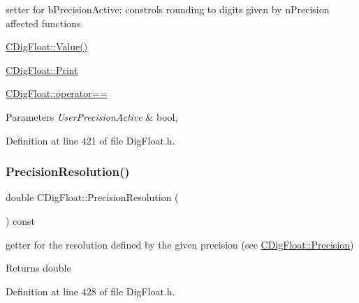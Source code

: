 setter for b\+Precision\+Active\+: constrols rounding to digits given by n\+Precision affected functions 


\begin{DoxyItemize}
\item \hyperlink{classCDigFloat_af74b8cd0935294b6371f551b7a1ff640}{C\+Dig\+Float\+::\+Value()}
\item \hyperlink{classCDigFloat_a80731e0970f607114d6d1bde4d02bd39}{C\+Dig\+Float\+::\+Print}
\item \hyperlink{classCDigFloat_ad8980d984bf2bab71d15b830fd0180a5}{C\+Dig\+Float\+::operator==}
\end{DoxyItemize}


\begin{DoxyParams}{Parameters}
{\em User\+Precision\+Active} & bool, \\
\hline
\end{DoxyParams}


Definition at line 421 of file Dig\+Float.\+h.

\mbox{\label{classCDigFloat_a8b229b407a4adff339f086856b52078b}} 
\subsubsection{\texorpdfstring{Precision\+Resolution()}{PrecisionResolution()}}
{\footnotesize\ttfamily double C\+Dig\+Float\+::\+Precision\+Resolution (\begin{DoxyParamCaption}{ }\end{DoxyParamCaption}) const\hspace{0.3cm}{\ttfamily [inline]}}



getter for the resolution defined by the given precision (see \hyperlink{classCDigFloat_ad66e2fc1bb19f491dfbc4fb7bfb20d47}{C\+Dig\+Float\+::\+Precision}) 

\begin{DoxyReturn}{Returns}
double 
\end{DoxyReturn}


Definition at line 428 of file Dig\+Float.\+h.

\mbox{\label{classCDigFloat_a80731e0970f607114d6d1bde4d02bd39}} 

